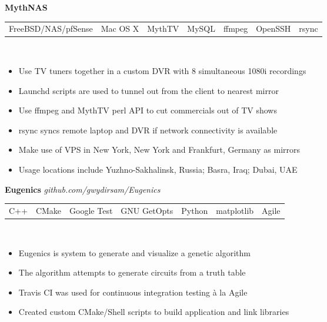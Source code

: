 \documentclass[resmargin,line,12pt]{res}
\begin{document}
{\begin{resume}
{\bf MythNAS} \
\\
\begin{tabular}{l l l l l l l}
  FreeBSD/NAS/pfSense & Mac OS X & MythTV & MySQL & ffmpeg & OpenSSH & rsync
\end{tabular}
\\
\vspace{-.16in}
\begin{itemize}
  \item Use TV tuners together in a custom DVR with 8 simultaneous 1080i recordings
  \item Launchd scripts are used to tunnel out from the client to nearest mirror
  \item Use ffmpeg and MythTV perl API to cut commercials out of TV shows
  \item rsync syncs remote laptop and DVR if network connectivity is available
  \item Make use of VPS in New York, New York and Frankfurt, Germany as mirrors
  \item Usage locations include Yuzhno-Sakhalinsk, Russia; Basra, Iraq; Dubai, UAE
\end{itemize}
\vspace{-.10in}

{\bf Eugenics } {\em github.com/gwydirsam/Eugenics }  \
\\
\begin{tabular}{l l l l l l l} 
  C++ & CMake & Google Test & GNU GetOpts & Python & matplotlib & Agile
\end{tabular}
\\
\vspace{-.16in}
\begin{itemize}
  \item Eugenics is system to generate and visualize a genetic algorithm
  \item The algorithm attempts to generate circuits from a truth table
  \item Travis CI was used for continuous integration testing \`{a} la Agile
  \item Created custom CMake/Shell scripts to build application and link libraries
\end{itemize}
\vspace{-.10in}


\end{resume}}
\end{document}
